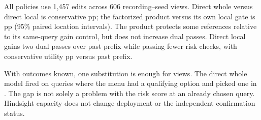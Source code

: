 All policies use 1,457 edits across 606 recording--seed views.
Direct whole versus direct local is \CFSupportWholeLocal{} conservative
pp; the factorized product versus its own local gate is
\CFSupportFactorLocalContrast{} pp (95\% paired location intervals).
The product protects some references relative to its same-query gain
control, but does not increase dual passes. Direct local gains two
dual passes over past prefix while passing fewer risk checks, with
conservative utility \CFSupportLocalPrefix{} pp versus past prefix.

With outcomes known, one substitution is enough for
\CFSupportOracle{} views. The direct whole model fired on
\CFSupportOffered{} queries where the menu had a qualifying option
and picked one in \CFSupportHit{}. The gap is not solely a problem
with the risk score at an already chosen query. Hindsight capacity
does not change deployment or the independent confirmation status.

